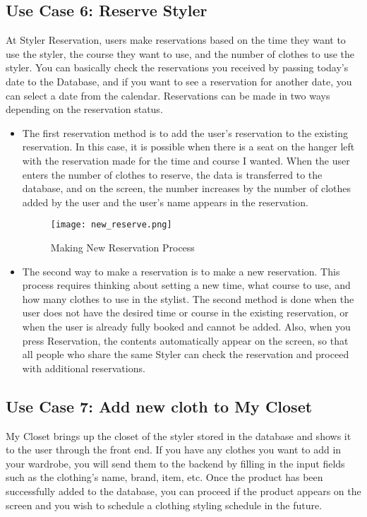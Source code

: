\documentclass[conference]{IEEEtran}
\begin{document}
\subsection{Use Case 6: Reserve Styler}
At Styler Reservation, users make reservations based on the time they want to use the styler, the course they want to use, and the number of clothes to use the styler. You can basically check the reservations you received by passing today's date to the Database, and if you want to see a reservation for another date, you can select a date from the calendar. Reservations can be made in two ways depending on the reservation status.\\
\begin{itemize}
    \begin{figure}[htbp]
    \centerline{\texttt{[image: add\_reserve.png]}}
    \label{fig}
    \caption{Adding Reservation Process}
    \end{figure}
    \item The first reservation method is to add the user's reservation to the existing reservation. In this case, it is possible when there is a seat on the hanger left with the reservation made for the time and course I wanted. When the user enters the number of clothes to reserve, the data is transferred to the database, and on the screen, the number increases by the number of clothes added by the user and the user's name appears in the reservation.\\
    
    \begin{figure}[htbp]
    \centerline{\texttt{[image: new\_reserve.png]}}
    \label{fig}
    \caption{Making New Reservation Process}
    \end{figure}
    \item The second way to make a reservation is to make a new reservation. This process requires thinking about setting a new time, what course to use, and how many clothes to use in the stylist. The second method is done when the user does not have the desired time or course in the existing reservation, or when the user is already fully booked and cannot be added. Also, when you press Reservation, the contents automatically appear on the screen, so that all people who share the same Styler can check the reservation and proceed with additional reservations.\\
\end{itemize}

\subsection{Use Case 7: Add new cloth to My Closet}
My Closet brings up the closet of the styler stored in the database and shows it to the user through the front end. If you have any clothes you want to add in your wardrobe, you will send them to the backend by filling in the input fields such as the clothing's name, brand, item, etc. Once the product has been successfully added to the database, you can proceed if the product appears on the screen and you wish to schedule a clothing styling schedule in the future.\\
\end{document}

